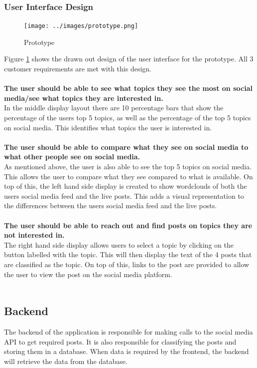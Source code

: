 \subsubsection{User Interface Design}
\begin{figure}
    \centering
    \texttt{[image: ../images/prototype.png]}
    \caption{Prototype}
    \label{fig:prototype}
\end{figure}
Figure \ref{fig:prototype} shows the drawn out design of the user interface for the prototype. All 3 customer requirements are met
with this design.\\\\
\textbf{The user should be able to see what topics they see the most on social media/see what topics they are interested in.}\\
In the middle display layout there are 10 percentage bars that show the percentage of the users top 5 topics, as well as the percentage
of the top 5 topics on social media. This identifies what topics the user is interested in.\\\\
\textbf{The user should be able to compare what they see on social media to what other people see on social media.}\\
As mentioned above, the user is also able to see the top 5 topics on social media. This allows the user to compare what they see
compared to what is available. On top of this, the left hand side display is created to show wordclouds of both the users social media feed
and the live posts. This adds a visual representation to the differences between the users social media feed and the live posts.\\\\
\textbf{The user should be able to reach out and find posts on topics they are not interested in.}\\
The right hand side display allows users to select a topic by clicking on the button labelled with the topic. This will then display the text
 of the 4 posts that are classified as the topic. On top of this, links to the post are provided to allow the user to view the post on the social
media platform.\\\\
\subsection{Backend}
The backend of the application is responsible for making calls to the social media API to get required posts. It is also responsible
for classifying the posts and storing them in a database. When data is required by the frontend, the backend will retrieve the data
from the database.\\
